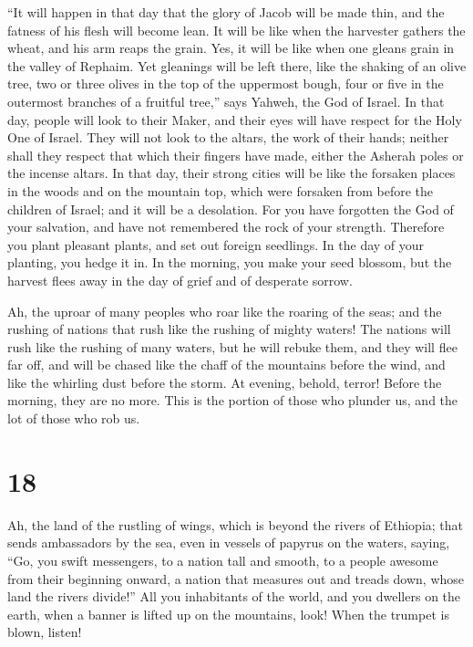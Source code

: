  ``It will happen in that day that the glory of Jacob will
be made thin, and the fatness of his flesh will become lean.
 It will be like when the harvester gathers the wheat, and
his arm reaps the grain. Yes, it will be like when one gleans grain in
the valley of Rephaim.  Yet gleanings will be left there,
like the shaking of an olive tree, two or three olives in the top of the
uppermost bough, four or five in the outermost branches of a fruitful
tree,'' says Yahweh, the God of Israel.  In that day, people
will look to their Maker, and their eyes will have respect for the Holy
One of Israel.  They will not look to the altars, the work
of their hands; neither shall they respect that which their fingers have
made, either the Asherah poles or the incense altars.  In
that day, their strong cities will be like the forsaken places in the
woods and on the mountain top, which were forsaken from before the
children of Israel; and it will be a desolation.  For you
have forgotten the God of your salvation, and have not remembered the
rock of your strength. Therefore you plant pleasant plants, and set out
foreign seedlings.  In the day of your planting, you hedge
it in. In the morning, you make your seed blossom, but the harvest flees
away in the day of grief and of desperate sorrow.

 Ah, the uproar of many peoples who roar like the roaring
of the seas; and the rushing of nations that rush like the rushing of
mighty waters!  The nations will rush like the rushing of
many waters, but he will rebuke them, and they will flee far off, and
will be chased like the chaff of the mountains before the wind, and like
the whirling dust before the storm.  At evening, behold,
terror! Before the morning, they are no more. This is the portion of
those who plunder us, and the lot of those who rob us.

\hypertarget{section-17}{%
\section{18}\label{section-17}}

 Ah, the land of the rustling of wings, which is beyond the
rivers of Ethiopia;  that sends ambassadors by the sea, even
in vessels of papyrus on the waters, saying, ``Go, you swift messengers,
to a nation tall and smooth, to a people awesome from their beginning
onward, a nation that measures out and treads down, whose land the
rivers divide!''  All you inhabitants of the world, and you
dwellers on the earth, when a banner is lifted up on the mountains,
look! When the trumpet is blown, listen!

